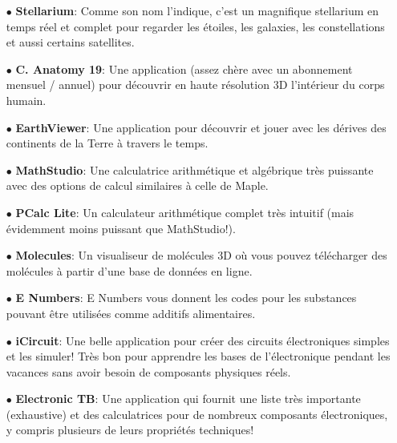 \begin{itemize}
		\item[$\bullet$] \textbf{Stellarium}: Comme son nom l'indique, c'est un magnifique stellarium en temps réel et complet pour regarder les étoiles, les galaxies, les constellations et aussi certains satellites.
		
		 \item[$\bullet$] \textbf{C. Anatomy 19}: Une application (assez chère avec un abonnement mensuel / annuel) pour découvrir en haute résolution 3D l'intérieur du corps humain.
		 
		 \item[$\bullet$] \textbf{EarthViewer}: Une application pour découvrir et jouer avec les dérives des continents de la Terre à travers le temps.
		 
		 \item[$\bullet$] \textbf{MathStudio}: Une calculatrice arithmétique et algébrique très puissante avec des options de calcul similaires à celle de Maple.
		 
		 \item[$\bullet$] \textbf{PCalc Lite}: Un calculateur arithmétique complet très intuitif (mais évidemment moins puissant que MathStudio!).
		 
		 \item[$\bullet$] \textbf{Molecules}: Un visualiseur de molécules 3D où vous pouvez télécharger des molécules à partir d'une base de données en ligne.
		 
		 \item[$\bullet$] \textbf{E Numbers}: E Numbers vous donnent les codes pour les substances pouvant être utilisées comme additifs alimentaires.
		 
		 \item[$\bullet$] \textbf{iCircuit}: Une belle application pour créer des circuits électroniques simples et les simuler! Très bon pour apprendre les bases de l'électronique pendant les vacances sans avoir besoin de composants physiques réels.
		 
		 \item[$\bullet$] \textbf{Electronic TB}: Une application qui fournit une liste très importante (exhaustive) et des calculatrices pour de nombreux composants électroniques, y compris plusieurs de leurs propriétés techniques!
	\end{itemize}